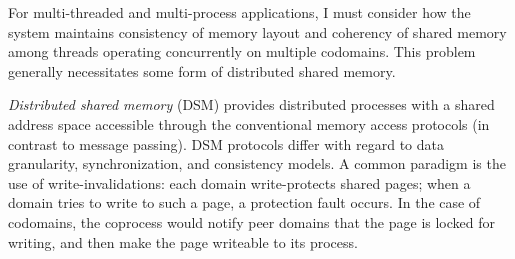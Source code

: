 %

%
%
%
%
%


%
For multi-threaded and multi-process applications, I must consider how the
system maintains consistency of memory layout and coherency of shared memory
among threads operating concurrently on multiple codomains.
%
This problem generally necessitates some form of distributed shared memory.


\emph{Distributed shared memory} (DSM) provides distributed processes with a
shared address space accessible through the conventional memory access protocols
(in contrast to message passing).
%
DSM protocols differ with regard to data granularity, synchronization,
and consistency models.
%
A common paradigm is the use of  write-invalidations: each domain
write-protects shared pages; when a domain tries to write to such a page, a
protection fault occurs.
%
In the case of codomains, the coprocess would notify peer domains that the
page is locked for writing, and then make the page writeable to its process.


